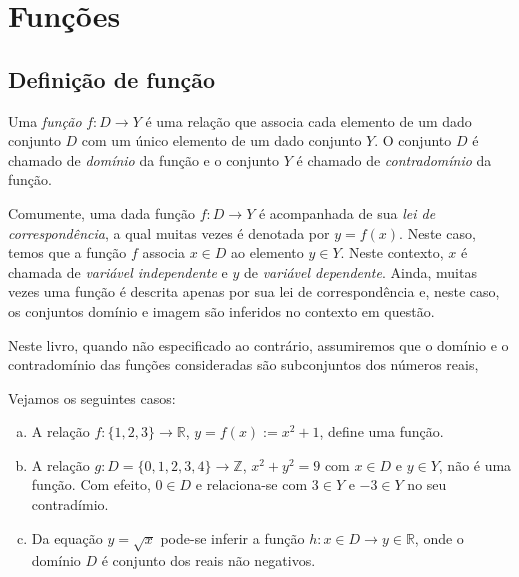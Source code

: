 
\chapter{Funções}\label{cap:funcoes}

\section{Definição de função}

\begin{defn}
  Uma \emph{função} $f:D \to Y$ é uma relação que associa cada elemento de um dado conjunto $D$ com um único elemento de um dado conjunto $Y$. O conjunto $D$ é chamado de \emph{domínio} da função e o conjunto $Y$ é chamado de \emph{contradomínio} da função.
\end{defn}

Comumente, uma dada função $f:D\to Y$ é acompanhada de sua \emph{lei de correspondência}, a qual muitas vezes é denotada por $y = f(x)$. Neste caso, temos que a função $f$ associa $x\in D$ ao elemento $y\in Y$. Neste contexto, $x$ é chamada de \emph{variável independente} e $y$ de \emph{variável dependente}. Ainda, muitas vezes uma função é descrita apenas por sua lei de correspondência e, neste caso, os conjuntos domínio e imagem são inferidos no contexto em questão.

\begin{obs}
  Neste livro, quando não especificado ao contrário, assumiremos que o domínio e o contradomínio das funções consideradas são subconjuntos dos números reais,
\end{obs}

\begin{ex} Vejamos os seguintes casos:
  \begin{enumerate}[a)]
  \item A relação $f:\{1,2,3\}\to\mathbb{R}$, $y = f(x) := x^2 + 1$, define uma função.
  \item A relação $g:D=\{0,1,2,3,4\}\to\mathbb{Z}$, $x^2 + y^2 = 9$ com $x\in D$ e $y\in Y$, não é uma função. Com efeito, $0\in D$ e relaciona-se com $3\in Y$ e $-3\in Y$ no seu contradímio.
  \item Da equação $y = \sqrt{x}$ pode-se inferir a função $h:x\in D \to y\in\mathbb{R}$, onde o domínio $D$ é conjunto dos reais não negativos.
  \end{enumerate}
\end{ex}

